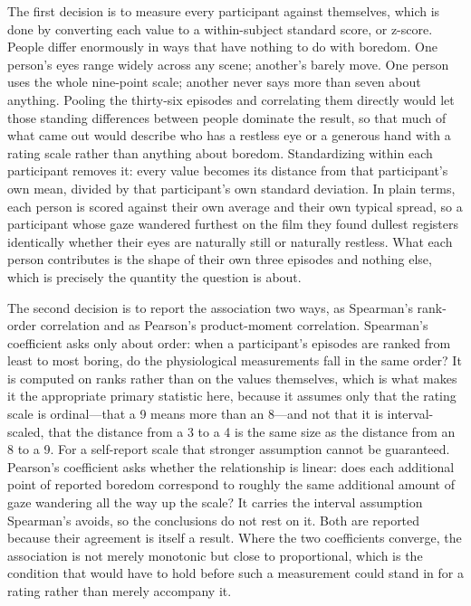 The first decision is to measure every participant against themselves, which is done by
converting each value to a within-subject standard score, or z-score. People differ enormously
in ways that have nothing to do with boredom. One person's eyes range widely across any scene;
another's barely move. One person uses the whole nine-point scale; another never says more than
seven about anything. Pooling the thirty-six episodes and correlating them directly would let
those standing differences between people dominate the result, so that much of what came out
would describe who has a restless eye or a generous hand with a rating scale rather than
anything about boredom. Standardizing within each participant removes it: every value becomes
its distance from that participant's own mean, divided by that participant's own standard
deviation. In plain terms, each person is scored against their own average and their own
typical spread, so a participant whose gaze wandered furthest on the film they found dullest
registers identically whether their eyes are naturally still or naturally restless. What each
person contributes is the shape of their own three episodes and nothing else, which is precisely
the quantity the question is about.

The second decision is to report the association two ways, as Spearman's rank-order correlation
and as Pearson's product-moment correlation. Spearman's coefficient asks only about order: when
a participant's episodes are ranked from least to most boring, do the physiological measurements
fall in the same order? It is computed on ranks rather than on the values themselves, which is
what makes it the appropriate primary statistic here, because it assumes only that the rating
scale is ordinal---that a 9 means more than an 8---and not that it is interval-scaled, that the
distance from a 3 to a 4 is the same size as the distance from an 8 to a 9. For a
self-report scale that stronger assumption cannot be guaranteed. Pearson's coefficient asks
whether the relationship is linear: does each additional point of reported boredom correspond to
roughly the same additional amount of gaze wandering all the way up the scale? It carries the
interval assumption Spearman's avoids, so the conclusions do not rest on it. Both are reported
because their agreement is itself a result. Where the two coefficients converge, the association
is not merely monotonic but close to proportional, which is the condition that would have to
hold before such a measurement could stand in for a rating rather than merely accompany it.

